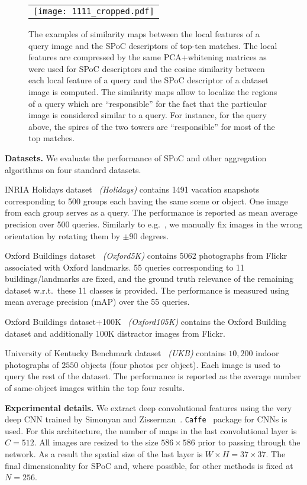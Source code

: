 \begin{figure*}
\centering
\begin{tabular}{c}
\texttt{[image: 1111\_cropped.pdf]}
\end{tabular}
\caption{The examples of similarity maps between the local features of a query image and the SPoC descriptors of top-ten matches. The local features are compressed by the same PCA+whitening matrices as were used for SPoC descriptors and the cosine similarity between each local feature of a query and the SPoC descriptor of a dataset image is computed. The similarity maps allow to localize the regions of a query which are ``responsible'' for the fact that the particular image is considered similar to a query. For instance, for the query above, the spires of the two towers are ``responsible'' for most of the top matches.}
\label{fig:localSimilarities}
\end{figure*}

{\bf Datasets.} We evaluate the performance of SPoC and other aggregation algorithms on four standard datasets.

INRIA Holidays dataset~\cite{Holidays} {\em (Holidays)} contains 1491 vacation snapshots corresponding to 500 groups each having the same scene or object. One image from each group serves as a query. The performance is reported as mean average precision over 500 queries. Similarly to e.g.~\cite{Babenko14}, we manually fix images in the wrong orientation by rotating them by $\pm 90$ degrees.

Oxford Buildings dataset~\cite{Philbin07} {\em (Oxford5K)} contains 5062 photographs from Flickr associated with Oxford landmarks. 55 queries corresponding to 11 buildings/landmarks are fixed, and the ground truth relevance of the remaining dataset w.r.t.\ these 11 classes is provided. The performance is measured using mean average precision (mAP) over the 55 queries.

Oxford Buildings dataset+100K~\cite{Philbin07} {\em (Oxford105K)} contains the Oxford Building dataset and additionally 100K distractor images from Flickr.

University of Kentucky Benchmark dataset~\cite{Nister06} {\em (UKB)} contains $10,200$ indoor photographs of $2550$ objects (four photos per object). Each image is used to query the rest of the dataset. The performance is reported as the average number of same-object images within the top four results.

{\bf Experimental details.} We extract deep convolutional features using the very deep CNN trained by Simonyan and Zisserman~\cite{Simonyan14}. {\tt Caffe}~\cite{Caffe} package for CNNs is used. For this architecture, the number of maps in the last convolutional layer is $C=512$. All images are resized to the size $586\times586$ prior to passing through the network. As a result the spatial size of the last layer is $W\times H=37\times 37$. The final dimensionality for SPoC and, where possible, for other methods is fixed at $N=256$. 



